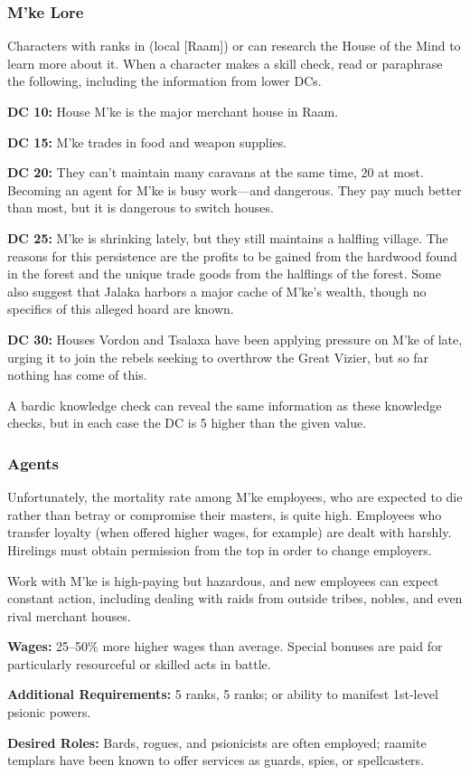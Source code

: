 \subsubsection{M'ke Lore}
Characters with ranks in  (local [Raam]) or  can research the House of the Mind to learn more about it. When a character makes a skill check, read or paraphrase the following, including the information from lower DCs.

\textbf{DC 10:} House M'ke is the major merchant house in Raam.

\textbf{DC 15:} M'ke trades in food and weapon supplies.

\textbf{DC 20:} They can't maintain many caravans at the same time, 20 at most. Becoming an agent for M'ke is busy work---and dangerous. They pay much better than most, but it is dangerous to switch houses.

\textbf{DC 25:} M'ke is shrinking lately, but they still maintains a halfling village. The reasons for this persistence are the profits to be gained from the hardwood found in the forest and the unique trade goods from the halflings of the forest. Some also suggest that Jalaka harbors a major cache of M'ke's wealth, though no specifics of this alleged hoard are known.

\textbf{DC 30:} Houses Vordon and Tsalaxa have been applying pressure on M’ke of late, urging it to join the rebels seeking to overthrow the Great Vizier, but so far nothing has come of this.

A bardic knowledge check can reveal the same information as these knowledge checks, but in each case the DC is 5 higher than the given value.

\subsubsection{Agents}
Unfortunately, the mortality rate among M'ke employees, who are expected to die rather than betray or compromise their masters, is quite high. Employees who transfer loyalty (when offered higher wages, for example) are dealt with harshly. Hirelings must obtain permission from the top in order to change employers.

Work with M'ke is high-paying but hazardous, and new employees can expect constant action, including dealing with raids from outside tribes, nobles, and even rival merchant houses.

\textbf{Wages:} 25--50\% more higher wages than average. Special bonuses are paid for particularly resourceful or skilled acts in battle.

\textbf{Additional Requirements:}  5 ranks,  5 ranks; or ability to manifest 1st-level psionic powers.

\textbf{Desired Roles:} Bards, rogues, and psionicists are often employed; raamite templars have been known to offer services as guards, spies, or spellcasters.